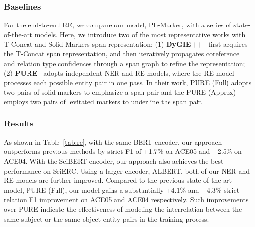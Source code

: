 \documentclass[11pt]{article}
\newcommand\base{\xspace}
\newcommand\bb{\xspace}
\newcommand\blarge{\xspace}
\newcommand\bl{\xspace}
\newcommand\xxlarge{\xspace}
\newcommand\xxl{\xspace}
\newcommand\Ourmodel{PL-Marker\xspace}
\begin{document}
\begin{table*}[!t]
{\begin{tabular}{l|c|c|ccc|ccc|ccc}
    \bottomrule
    \end{tabular}
}
 \caption{Overall entity and relation F1 scores on the test sets of ACE04, ACE05 and SciERC. The encoders used in different models: BERT\bb=BERT\base, BERT\bl = BERT\blarge, ALB\xxl = ALBERT\xxlarge.   Specially, TriMF, UniRE, PURE and \Ourmodel apply BERT\base on ACE04/05 and apply the SciBERT on SciERC.  denotes that the model leverages the cross-sentence information.  Representation Type: T--\emph{T-Concat}; S--\emph{Solid Marker}; \emph{L}--\emph{Levitated Marker}. Model name abbreviation: PURE-F: PURE (Full); PURE-A: PURE (Approx.).
 }
\label{tab:re}
\end{table*}
\subsubsection{Baselines} 
For the end-to-end RE, we compare our model,  \Ourmodel,  with a series of state-of-the-art models. Here, we introduce two of the most representative works  with  T-Concat and Solid Markers span representation: (1) \textbf{DyGIE++}~\cite{DyGIEpp} first acquires the T-Concat span representation, and then iteratively propagates coreference and relation type confidences  through a span  graph to refine the representation; 
(2)  \textbf{PURE}~\cite{PURE} adopts independent NER and RE models, where the RE model processes each possible entity pair in one pass. In their work, PURE (Full)  adopts two pairs of solid markers to emphasize a span pair and the PURE (Approx) employs two pairs of levitated markers to underline the span pair. 



\subsubsection{Results}

As shown in Table~\ref{tab:re},  with the same BERT\base encoder, our approach outperforms previous methods by strict F1 of +1.7\% on ACE05 and +2.5\% on ACE04. With the SciBERT encoder, our  approach also achieves the best performance on SciERC. Using a larger encoder,  ALBERT\xxlarge, both of our NER and RE models are further improved. Compared to the previous state-of-the-art model,  PURE (Full), our model gains a substantially +4.1\% and  +4.3\%  strict relation F1 improvement on ACE05 and ACE04 respectively. 
Such improvements over PURE indicate the effectiveness of modeling the interrelation between the same-subject or the same-object entity pairs in the training process.  
\end{document}
